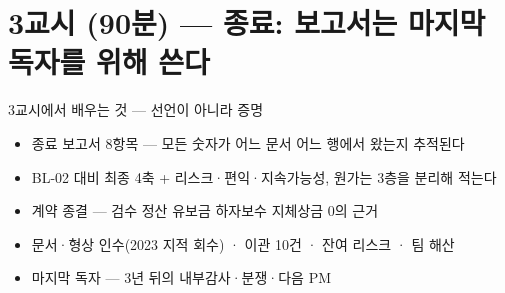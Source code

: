\section{3교시 (90분) — 종료: 보고서는 마지막 독자를 위해 쓴다}

\begin{frame}{3교시에서 배우는 것 — 선언이 아니라 증명}
\begin{itemize}
\item 종료 보고서 8항목 — 모든 숫자가 어느 문서 어느 행에서 왔는지 추적된다
\item BL-02 대비 최종 4축 + 리스크·편익·지속가능성, 원가는 3층을 분리해 적는다
\item 계약 종결 — 검수 \ra{} 정산 \ra{} 유보금 \ra{} 하자보수 \ra{} 지체상금 0의 근거
\item 문서·형상 인수(2023 지적 회수) · 이관 10건 · 잔여 리스크 · 팀 해산
\item 마지막 독자 — 3년 뒤의 내부감사·분쟁·다음 PM
\end{itemize}
\end{frame}

